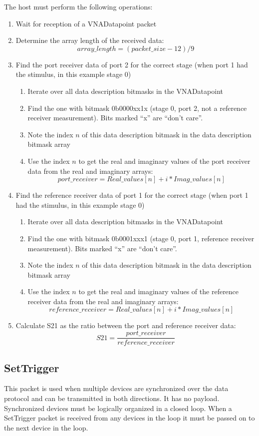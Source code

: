 \documentclass[a4paper,11pt]{article}
\begin{document}
\hfill\newline
The host must perform the following operations:
\begin{enumerate}
\item Wait for reception of a VNADatapoint packet
\item Determine the array length of the received data: $$array\_length = (packet\_size - 12) / 9$$ 
\item Find the port receiver data of port 2 for the correct stage (when port 1 had the stimulus, in this example stage 0)
\begin{enumerate}
\item Iterate over all data description bitmasks in the VNADatapoint
\item Find the one with bitmask 0b0000xx1x (stage 0, port 2, not a reference receiver measurement). Bits marked ``x'' are ``don't care''.
\item Note the index $n$ of this data description bitmask in the data description bitmask array
\item Use the index $n$ to get the real and imaginary values of the port receiver data from the real and imaginary arrays: $$port\_receiver = Real\_values[n] + i * Imag\_values[n]$$
\end{enumerate}
\item Find the reference receiver data of port 1 for the correct stage (when port 1 had the stimulus, in this example stage 0)
\begin{enumerate}
\item Iterate over all data description bitmasks in the VNADatapoint
\item Find the one with bitmask 0b0001xxx1 (stage 0, port 1, reference receiver measurement). Bits marked ``x'' are ``don't care''.
\item Note the index $n$ of this data description bitmask in the data description bitmask array
\item Use the index $n$ to get the real and imaginary values of the reference receiver data from the real and imaginary arrays: $$reference\_receiver = Real\_values[n] + i * Imag\_values[n]$$
\end{enumerate}
\item Calculate S21 as the ratio between the port and reference receiver data: $$ S21 = \frac{port\_receiver}{reference\_receiver}$$
\end{enumerate}

\subsection{SetTrigger}
This packet is used when multiple devices are synchronized over the data protocol and can be transmitted in both directions. It has no payload. Synchronized devices must be logically organized in a closed loop. When a SetTrigger packet is received from any devices in the loop it must be passed on to the next device in the loop.
\end{document}
